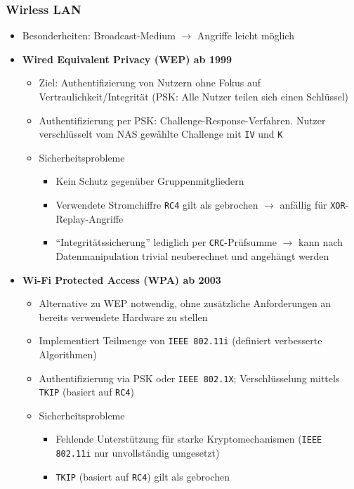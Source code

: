 \subsubsection{Wirless LAN}
\begin{itemize}
	\item Besonderheiten: Broadcast-Medium \(\rightarrow\) Angriffe leicht möglich
	\item \textbf{Wired Equivalent Privacy (WEP) ab 1999}
	\begin{itemize}
		\item Ziel: Authentifizierung von Nutzern ohne Fokus auf Vertraulichkeit/Integrität (PSK: Alle Nutzer teilen sich einen Schlüssel)
		\item Authentifizierung per PSK: Challenge-Response-Verfahren. Nutzer verschlüsselt vom NAS gewählte Challenge mit \texttt{IV} und \texttt{K}
		\item Sicherheitsprobleme
		\begin{itemize}
			\item Kein Schutz gegenüber Gruppenmitgliedern
			\item Verwendete Stromchiffre \texttt{RC4} gilt als gebrochen \(\rightarrow\) anfällig für \texttt{XOR}-Replay-Angriffe
			\item "`Integritätssicherung"' lediglich per \texttt{CRC}-Prüfsumme \(\rightarrow\) kann nach Datenmanipulation trivial neuberechnet und angehängt werden
		\end{itemize}
	\end{itemize}
	\item \textbf{Wi-Fi Protected Access (WPA) ab 2003}
	\begin{itemize}
		\item Alternative zu WEP notwendig, ohne zusätzliche Anforderungen an bereits verwendete Hardware zu stellen
		\item Implementiert Teilmenge von \texttt{IEEE 802.11i} (definiert verbesserte Algorithmen)
		\item Authentifizierung via PSK oder \texttt{IEEE 802.1X}; Verschlüsselung mittels \texttt{TKIP} (basiert auf \texttt{RC4})
		\item Sicherheitsprobleme
		\begin{itemize}
			\item Fehlende Unterstützung für starke Kryptomechanismen (\texttt{IEEE 802.11i} nur unvollständig umgesetzt)
			\item \texttt{TKIP} (basiert auf \texttt{RC4}) gilt als gebrochen
		\end{itemize}

\end{itemize}
\end{itemize}
